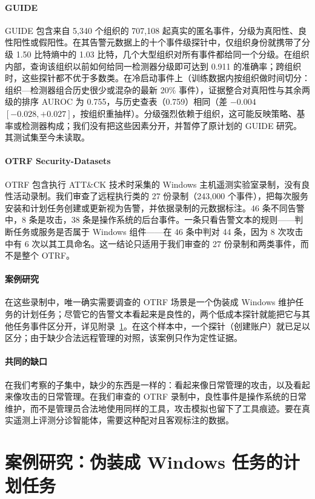 \paragraph{GUIDE~\citep{guide}} GUIDE 包含来自 5{,}340 个组织的 707{,}108 起真实的匿名事件，分级为真阳性、良性阳性或假阳性。在其告警元数据上的十个事件级探针中，仅组织身份就携带了分级 1.50 比特熵中的 1.03 比特，几个大型组织对所有事件都给同一个分级。在组织内部，查询该组织以前如何给同一检测器分级即可达到 0.911 的准确率；跨组织时，这些探针都不优于多数类。在冷启动事件上（训练数据内按组织做时间切分：组织—检测器组合历史很少或混杂的最新 20\% 事件），证据整合对真阳性与其余两级的排序 AUROC 为 0.755，与历史查表（0.759）相同（差 $-0.004$ $[-0.028,+0.027]$，按组织重抽样）。分级强烈依赖于组织，这可能反映策略、基率或检测器构成；我们没有把这些因素分开，并暂停了原计划的 GUIDE 研究。其测试集至今未读取。

\paragraph{OTRF Security-Datasets~\citep{otrf}} OTRF 包含执行 ATT\&CK 技术时采集的 Windows 主机遥测实验室录制，没有良性活动录制。我们审查了远程执行类的 27 份录制（243{,}000 个事件），把每次服务安装和计划任务创建或更新视为告警，并依据录制的元数据标注。46 条不同告警中，8 条是攻击，38 条是操作系统的后台事件。一条只看告警文本的规则——判断任务或服务是否属于 Windows 组件——在 46 条中判对 44 条，因为 8 次攻击中有 6 次以其工具命名。这一结论只适用于我们审查的 27 份录制和两类事件，而不是整个 OTRF。

\paragraph{案例研究} 在这些录制中，唯一确实需要调查的 OTRF 场景是一个伪装成 Windows 维护任务的计划任务；尽管它的告警文本看起来是良性的，两个低成本探针就能把它与其他任务事件区分开，详见附录~\ref{app:case}。在这个样本中，一个探针（创建账户）就已足以区分；由于缺少合法远程管理的对照，该案例只作为定性证据。

\paragraph{共同的缺口} 在我们考察的子集中，缺少的东西是一样的：看起来像日常管理的攻击，以及看起来像攻击的日常管理。在我们审查的 OTRF 录制中，良性事件是操作系统的日常维护，而不是管理员合法地使用同样的工具，攻击模拟也留下了工具痕迹。要在真实遥测上评测分诊智能体，需要这种配对且客观标注的数据。

\section{案例研究：伪装成 Windows 任务的计划任务}
\label{app:case}

